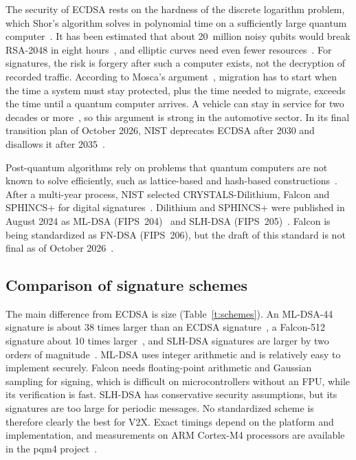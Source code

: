 \documentclass[10pt,twoside,a4paper]{article}
\begin{document}
The security of ECDSA rests on the hardness of the discrete logarithm problem, which Shor's algorithm solves in polynomial time on a sufficiently large quantum computer~\cite{Shor:1994}. It has been estimated that about 20~million noisy qubits would break RSA-2048 in eight hours~\cite{Gidney:2021}, and elliptic curves need even fewer resources~\cite{Roetteler:2017}. For signatures, the risk is forgery after such a computer exists, not the decryption of recorded traffic. According to Mosca's argument~\cite{Mosca:2018}, migration has to start when the time a system must stay protected, plus the time needed to migrate, exceeds the time until a quantum computer arrives. A vehicle can stay in service for two decades or more~\cite{Yoshizawa:2022}, so this argument is strong in the automotive sector. In its final transition plan of October 2026, NIST deprecates ECDSA after 2030 and disallows it after 2035~\cite{NIST:IR8547}.

Post-quantum algorithms rely on problems that quantum computers are not known to solve efficiently, such as lattice-based and hash-based constructions~\cite{Bernstein:2017}. After a multi-year process, NIST selected CRYSTALS-Dilithium, Falcon and SPHINCS+ for digital signatures~\cite{NIST:IR8413}. Dilithium and SPHINCS+ were published in August 2024 as ML-DSA (FIPS~204)~\cite{NIST:FIPS204} and SLH-DSA (FIPS~205)~\cite{NIST:FIPS205}. Falcon is being standardized as FN-DSA (FIPS~206), but the draft of this standard is not final as of October 2026~\cite{NIST:FIPS206}.

\subsection{Comparison of signature schemes}

The main difference from ECDSA is size (Table~\ref{t:schemes}). An ML-DSA-44 signature is about 38 times larger than an ECDSA signature~\cite{NIST:FIPS204,Ducas:Dilithium}, a Falcon-512 signature about 10 times larger~\cite{Fouque:Falcon}, and SLH-DSA signatures are larger by two orders of magnitude~\cite{NIST:FIPS205}. ML-DSA uses integer arithmetic and is relatively easy to implement securely. Falcon needs floating-point arithmetic and Gaussian sampling for signing, which is difficult on microcontrollers without an FPU, while its verification is fast. SLH-DSA has conservative security assumptions, but its signatures are too large for periodic messages. No standardized scheme is therefore clearly the best for V2X. Exact timings depend on the platform and implementation, and measurements on ARM Cortex-M4 processors are available in the pqm4 project~\cite{Kannwischer:pqm4}.
\end{document}

